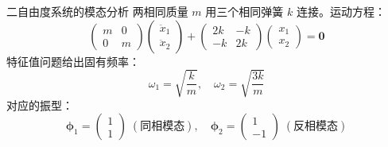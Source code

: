 \begin{example}{二自由度系统的模态分析}
	两相同质量 $m$ 用三个相同弹簧 $k$ 连接。运动方程：
	\[
	\begin{pmatrix} m & 0 \\ 0 & m \end{pmatrix}
	\begin{pmatrix} \ddot{x}_1 \\ \ddot{x}_2 \end{pmatrix}
	+ \begin{pmatrix} 2k & -k \\ -k & 2k \end{pmatrix}
	\begin{pmatrix} x_1 \\ x_2 \end{pmatrix} = \mathbf{0}
	\]
	特征值问题给出固有频率：
	\[
	\omega_1 = \sqrt{\frac{k}{m}}, \quad
	\omega_2 = \sqrt{\frac{3k}{m}}
	\]
	对应的振型：
	\[
	\boldsymbol{\phi}_1 = \begin{pmatrix} 1 \\ 1 \end{pmatrix} \;(\text{同相模态}), \quad
	\boldsymbol{\phi}_2 = \begin{pmatrix} 1 \\ -1 \end{pmatrix} \;(\text{反相模态})
	\]
\end{example}
